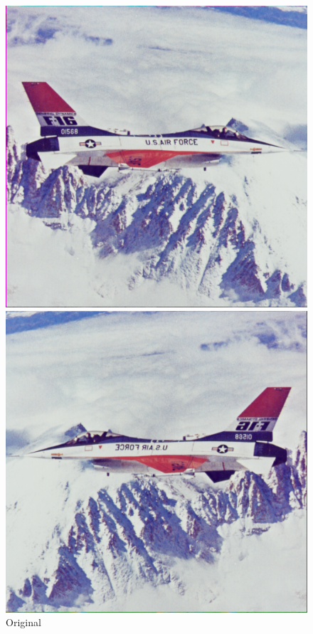 \documentclass[a4paper, 11pt, portuguese]{article}
\begin{document}
\begin{figure}[htbp]
\centering
\begin{minipage}{0.32\textwidth}
    \centering
    \includegraphics[width=\textwidth]{imagens/airplane.png}
    \caption*{Original}
\end{minipage}
\hfill
\begin{minipage}{0.32\textwidth}
    \centering
    \includegraphics[width=\textwidth]{imagens/airplane_mirror_h.png}

\end{minipage}
\end{figure}
\end{document}
